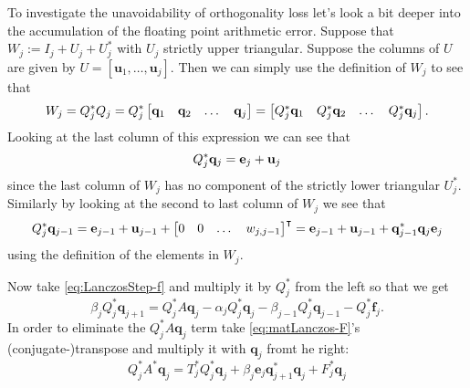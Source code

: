 \documentclass{article}
\begin{document}
To investigate the unavoidability of orthogonality loss let's look a bit deeper into the accumulation of the floating point arithmetic error. Suppose that $W_j:=I_j+U_j+U_j^{\ast}$ with $U_j$ strictly upper triangular. Suppose the columns of $U$ are given by $U=[\mathbf{u}_1,\ldots,\mathbf{u}_j]$.
Then we can simply use the definition of $W_j$ to see that
\begin{equation}
	W_j = Q_j^\ast Q_j = Q_j^\ast \begin{bmatrix}
		{\bf q}_1 &{\bf q}_2 &\dots &{\bf q}_j
	\end{bmatrix} = \begin{bmatrix}
	Q_j^\ast {\bf q}_1 &Q_j^\ast {\bf q}_2 &\dots &Q_j^\ast {\bf q}_j
	\end{bmatrix}.
\end{equation}
Looking at the last column of this expression we can see that 
\begin{equation}
	Q_j^\ast {\bf q}_j = {\bf e}_j+ {\bf u}_j
\end{equation}
since the last column of $W_j$ has no component of the strictly lower triangular $U_j^\ast$. Similarly by looking at the second to last column of $W_j$ we see that 
\begin{equation}
	Q_j^\ast {\bf q}_{j-1} = {\bf e}_{j-1}+ {\bf u}_{j-1} + \begin{bmatrix}
		0 & 0 & \dots & w_{j,j-1}
	\end{bmatrix}^\intercal = {\bf e}_{j-1}+ {\bf u}_{j-1} + {\bf q}_{j-1}^\ast {\bf q}_j {\bf e}_j
\end{equation}
using the definition of the elements in $W_j$.

Now take \autoref{eq:LanczosStep-f} and multiply it by $Q_j^\ast$ from the left so that we get 
\begin{equation}\label{eq:lanc-step-fqj}
	\beta_jQ_j^\ast\mathbf{q}_{j+1}=Q_j^\ast A\mathbf{q}_j-\alpha_jQ_j^\ast\mathbf{q}_j-\beta_{j-1}Q_j^\ast\mathbf{q}_{j-1} - Q_j^\ast\textbf{f}_j.
\end{equation}
In order to eliminate the $Q_j^\ast A\mathbf{q}_j$ term take \autoref{eq:matLanczos-F}'s (conjugate-)transpose and multiply it with $\textbf{q}_j$ fromt he right:
\begin{equation}
	Q_{j}^\ast A^\ast \textbf{q}_j  =T_j^\ast Q_j^\ast \textbf{q}_j +\beta_{j}\mathbf{e}_j\mathbf{q}_{j+1}^{\ast}\textbf{q}_j + F_j^\ast \textbf{q}_j
\end{equation} 
\end{document}
